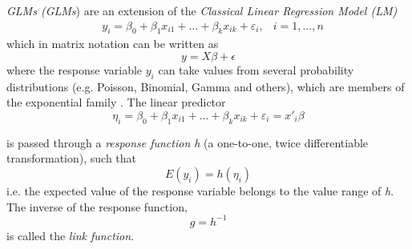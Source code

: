 \textit{\acl{GLM}s (\acs{GLM}s}) are an extension of the \textit{Classical Linear Regression Model (\acs{LM})}
$$
\begin{aligned}
&y_{i}=\beta_{0}+\beta_{1} x_{i 1}+\ldots+\beta_{k} x_{i k}+\varepsilon_{i}, &i=1, \ldots, n
\end{aligned}
$$
which in matrix notation can be written as
$$ y = X\beta + \epsilon $$
where the response variable $y_i$ can take values from several probability distributions (e.g. Poisson, Binomial, Gamma and others), which are members of the exponential family \cite{fahrmeir2003regression}. The linear predictor $$\eta_i = \beta_{0}+\beta_{1} x_{i 1}+\ldots+\beta_{k} x_{i k}+\varepsilon_{i} = x'_i \beta$$  


is passed through a \textit{response function h} (a one-to-one, twice differentiable transformation), such that
$$ E(y_i) = h(\eta_i)$$
i.e. the expected value of the response variable belongs to the value range of \textit{h}. The inverse of the response function, 
$$g = h^{-1}$$ is called the \textit{link function}.




